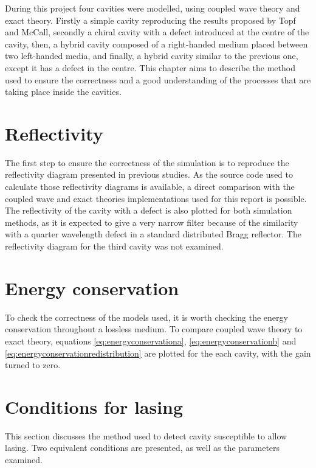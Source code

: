 During this project four cavities were modelled, using coupled wave theory and exact theory. Firstly a simple cavity reproducing the results proposed by Topf and McCall\cite{topf_modes_2014}, secondly a chiral cavity with a defect introduced at the centre of the cavity, then, a hybrid cavity composed of a right-handed medium placed between two left-handed media, and finally, a hybrid cavity similar to the previous one, except it has a defect in the centre. This chapter aims to describe the method used to ensure the correctness and a good understanding of the processes that are taking place inside the cavities.

\section{Reflectivity}

The first step to ensure the correctness of the simulation is to reproduce the reflectivity diagram presented in previous studies\cite{mccall_simplified_2009}. As the source code used to calculate those reflectivity diagrams is available, a direct comparison with the coupled wave and exact theories implementations used for this report is possible. The reflectivity of the cavity with a defect is also plotted for both simulation methods, as it is expected to give a very narrow filter because of the similarity with a quarter wavelength defect in a standard distributed Bragg reflector\cite{mccall_photonics_2020}. The reflectivity diagram for the third cavity was not examined.

\section{Energy conservation}

To check the correctness of the models used, it is worth checking the energy conservation throughout a lossless medium. To compare coupled wave theory to exact theory, equations \ref{eq:energyconservationa}, \ref{eq:energyconservationb} and \ref{eq:energyconservationredistribution} are plotted for the each cavity, with the gain turned to zero.

\section{Conditions for lasing}
This section discusses the method used to detect cavity susceptible to allow lasing. Two equivalent conditions are presented, as well as the parameters examined.

